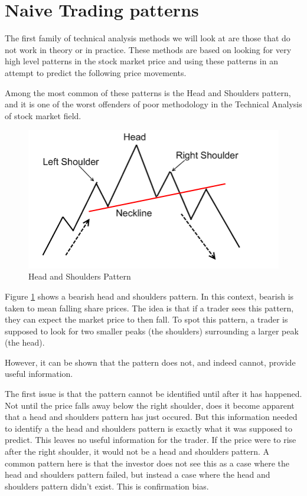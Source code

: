 \documentclass{report}
\begin{document}
\section{Naive Trading patterns}

The first family of technical analysis methods we will look at are those that do not work in theory or in practice. These methods are based on looking for very high level patterns in the stock market price and using these patterns in an attempt to predict the following price movements.

Among the most common of these patterns is the Head and Shoulders pattern, and it is one of the worst offenders of poor methodology in the Technical Analysis of stock market field.

\begin{figure}[H]
	\caption{Head and Shoulders Pattern \cite{website:headshoulders}}
	\centerline{\includegraphics[width=\textwidth]{vis/headshoulders.png}}
	\label{fig:headshoulders}
\end{figure}

Figure \ref{fig:headshoulders} shows a bearish head and shoulders pattern. In this context, bearish is taken to mean falling share prices. The idea is that if a trader sees this pattern, they can expect the market price to then fall. To spot this pattern, a trader is supposed to look for two smaller peaks (the shoulders) surrounding a larger peak (the head). 

However, it can be shown that the pattern does not, and indeed cannot, provide useful information. 

The first issue is that the pattern cannot be identified until after it has happened. Not until the price falls away below the right shoulder, does it become apparent that a head and shoulders pattern has just occured. But this information needed to identify a the head and shoulders pattern is exactly what it was supposed to predict. This leaves no useful information for the trader. If the price were to rise after the right shoulder, it would not be a head and shoulders pattern. A common pattern here is that the investor does not see this as a case where the head and shoulders pattern failed, but instead a case where the head and shoulders pattern didn't exist. This is confirmation bias.
\end{document}
